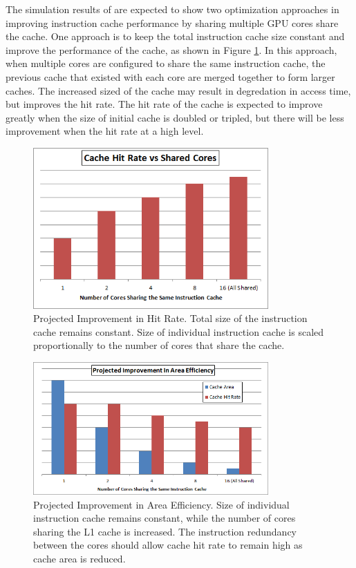 The simulation results of are expected to show two optimization
approaches in improving instruction cache performance by sharing
multiple GPU cores share the cache. 
One approach is to keep the total instruction cache size constant and
improve the performance of the cache, as shown in Figure
\ref{HitImprov}. 
In this approach, when multiple cores are configured to share the same
instruction cache, the previous cache that existed with each core are
merged together to form larger caches. 
The increased sized of the cache may result in degredation in access
time, but improves the hit rate. 
The hit rate of the cache is expected to improve greatly when the size
of initial cache is doubled or tripled, but there will be less
improvement when the hit rate at a high level.


\begin{figure}[t]
\centering
\includegraphics[width=90mm]{graphics/HitRateImprov.png}
\caption{Projected Improvement in Hit Rate. Total size of the instruction cache remains constant. Size of individual instruction cache is scaled proportionally to the number of cores that share the cache.}
\label{HitImprov}
\end{figure}


\begin{figure}[b!]
\centering
\includegraphics[width=90mm]{graphics/AreaEff.png}
\caption{Projected Improvement in Area Efficiency. Size of individual instruction cache remains constant, while the number of cores sharing the L1 cache is increased. The instruction redundancy between the cores should allow cache hit rate to remain high as cache area is reduced. }
\label{AreaEff}
\end{figure}


